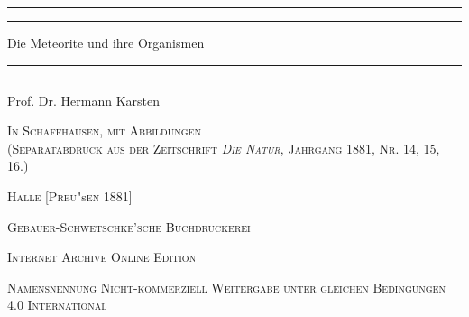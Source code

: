 \documentclass[a4paper, 11pt, oneside]{article}
\begin{document}
\frakfamily
\renewcommand{\contentsname}{
\frakfamily{Inhaltsverzeichnis}
}
\begin{titlepage} %
	\centering %

	
	\rule{\textwidth}{1.6pt}\vspace*{-\baselineskip}\vspace*{2pt} %
	\rule{\textwidth}{0.4pt} %
	
	\vspace{1.5\baselineskip} %
	
	{\Huge Die Meteorite und ihre Organismen}
	
	\vspace{1\baselineskip} %

	\rule{\textwidth}{0.4pt}\vspace*{-\baselineskip}\vspace{3.2pt} %
	\rule{\textwidth}{1.6pt} %
	
	\vspace{1\baselineskip} %
	
	
	{\large Prof. Dr. Hermann Karsten} %
	
	\vspace*{1\baselineskip} %
	
    {\scshape\small In Schaffhausen, mit Abbildungen\\ (Separatabdruck aus der Zeitschrift \emph{Die Natur}, Jahrgang 1881, Nr. 14, 15, 16.)} %
    
    \vspace*{\fill}

	\vspace{1\baselineskip}

	{\small\scshape Halle [Preu}\small "s{\small\scshape en 1881]}
	
	{\small\scshape{Gebauer-Schwetschke'sche Buchdruckerei}}
	
	\vspace{0.5\baselineskip} %

    \scshape Internet Archive Online Edition  %
	
	{\scshape\small Namensnennung Nicht-kommerziell Weitergabe unter gleichen Bedingungen 4.0 International} %
\end{titlepage}
\setlength{\parskip}{1mm plus1mm minus1mm}
\clearpage
\tableofcontents
\clearpage
\LARGE
\pagestyle{fancy}
\fancyhf{}
\cfoot{\frakfamily{\thepage}}
\end{document}

